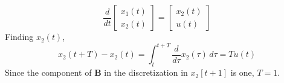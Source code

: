 \documentclass[]{article}
\newcommand{\diff}[1]{\frac{d}{d #1}}
\begin{document}
\section{}

\begin{equation}
	\diff{t} \begin{bmatrix}
	x_1(t) \\
	x_2(t)
	\end{bmatrix} =
	\begin{bmatrix}
	x_2(t) \\
	u(t)
	\end{bmatrix}
\end{equation}
Finding \(x_2(t)\),
\begin{equation}
	x_2(t + T) - x_2(t) = \int_t^{t + T} \diff{\tau} x_2(\tau) \, d\tau = T u(t)
\end{equation}
Since the component of \(\bm{B}\) in the discretization in \(x_2[t + 1]\) is one, \(T = 1\).
\end{document}
